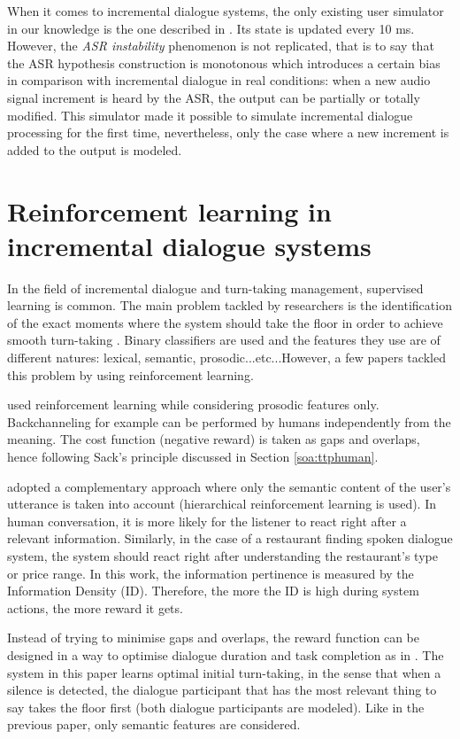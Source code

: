 			When it comes to incremental dialogue systems, the only existing user simulator in our knowledge is the one described in \cite{Selfridge2012b}. Its state is updated every 10 ms. However, the \textit{ASR instability} phenomenon is not replicated, that is to say that the ASR hypothesis construction is monotonous which introduces a certain bias in comparison with incremental dialogue in real conditions: when a new audio signal increment is heard by the ASR, the output can be partially or totally modified. This simulator made it possible to simulate incremental dialogue processing for the first time, nevertheless, only the case where a new increment is added to the output is modeled.
				
\section{Reinforcement learning in incremental dialogue systems}

	In the field of incremental dialogue and turn-taking management, supervised learning is common. The main problem tackled by researchers is the identification of the exact moments where the system should take the floor in order to achieve smooth turn-taking \cite{Raux2008,Gravano2011,Meena2013}. Binary classifiers are used and the features they use are of different natures: lexical, semantic, prosodic...etc...However, a few papers tackled this problem by using reinforcement learning.
        
	\cite{Jonsdottir2008} used reinforcement learning while considering prosodic features only. Backchanneling for example can be performed by humans independently from the meaning. The cost function (negative reward) is taken as gaps and overlaps, hence following Sack's principle discussed in Section \ref{soa:ttphuman}.
	
	\cite{Dethlefs2012} adopted a complementary approach where only the semantic content of the user's utterance is taken into account (hierarchical reinforcement learning is used). In human conversation, it is more likely for the listener to react right after a relevant information. Similarly, in the case of a restaurant finding spoken dialogue system, the system should react right after understanding the restaurant's type or price range. In this work, the information pertinence is measured by the Information Density (ID). Therefore, the more the ID is high during system actions, the more reward it gets.
	
	Instead of trying to minimise gaps and overlaps, the reward function can be designed in a way to optimise dialogue duration and task completion as in \cite{Selfridge2010}. The system in this paper learns optimal initial turn-taking, in the sense that when a silence is detected, the dialogue participant that has the most relevant thing to say takes the floor first (both dialogue participants are modeled). Like in the previous paper, only semantic features are considered.
	
